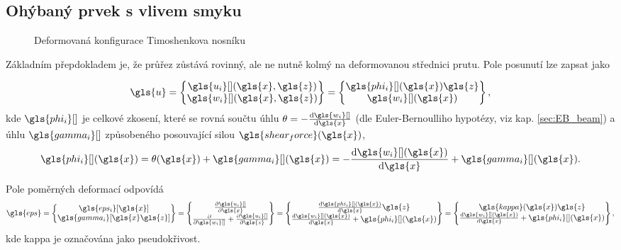 \subsection{Ohýbaný prvek s vlivem smyku} \label{sec:TIM_beam}

\begin{figure}[H]
    
    \caption{Deformovaná konfigurace Timoshenkova nosníku}
    \label{fig:tim_deformed_beam}
\end{figure}

Základním přepdokladem je, že průřez zůstává rovinný, ale ne nutně kolmý na deformovanou střednici prutu. Pole posunutí lze zapsat jako

\begin{equation}
    \gls{u} 
    = 
    \begin{Bmatrix}
        \gls{u_i}[ ](\gls{x}, \gls{z}) \\
        \gls{w_i}[ ](\gls{x}, \gls{z})
    \end{Bmatrix}
    =
    \begin{Bmatrix}
        \gls{phi_i}[ ](\gls{x}) \gls{z}\\
        \gls{w_i}[ ](\gls{x})
    \end{Bmatrix},
\end{equation}
kde $\gls{phi_i}[ ]$ je celkové zkosení, které se rovná součtu úhlu $\theta = -\dv{\gls{w_i}[ ]}{\gls{x}}$ (dle Euler-Bernoulliho hypotézy, viz kap. \ref{sec:EB_beam}) a úhlu $\gls{gamma_i}[ ]$ způsobeného posouvající silou $\gls{shear_force}(\gls{x})$,
\begin{equation}
    \label{eq:tim_phi}
    \gls{phi_i}[ ](\gls{x}) = \theta(\gls{x}) + \gls{gamma_i}[ ](\gls{x}) = -\dv{\gls{w_i}[ ](\gls{x})}{\gls{x}} + \gls{gamma_i}[ ](\gls{x}).
\end{equation}

Pole poměrných deformací odpovídá
\begin{equation}
    \gls{eps}
    =
    \begin{Bmatrix}
        \gls{eps_i}[\gls{x}] \\
        \gls{gamma_i}[\gls{x}\gls{z}]
    \end{Bmatrix}
    =
    \begin{Bmatrix}
        \pdv{\gls{u_i}[ ]}{\gls{x}} \\
        \pdv{\gls{w_i}[ ]} + \pdv{\gls{u_i}[ ]}{\gls{z}}
    \end{Bmatrix}
    =
    \begin{Bmatrix}
        \dv{\gls{phi_i}[ ](\gls{x})}{\gls{x}} \gls{z} \\
        \dv{\gls{w_i}[ ](\gls{x})}{\gls{x}} + \gls{phi_i}[ ](\gls{x})
    \end{Bmatrix}
    =
    \begin{Bmatrix}
        \gls{kappa}(\gls{x}) \gls{z}\\
        \dv{\gls{w_i}[ ](\gls{x})}{\gls{x}} + \gls{phi_i}[ ](\gls{x})
    \end{Bmatrix}
    ,
\end{equation}
kde \gls{kappa} je označována jako pseudokřivost.

